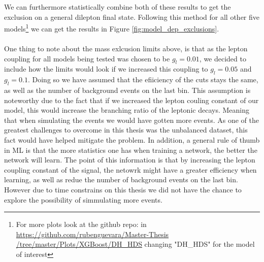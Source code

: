 \documentclass[12pt, a4paper]{book}
\begin{document}
\noindent We can furthermore statistically combine both of these results to get the exclusion on a general dilepton final state. Following this method for all other five models\footnote{For more plots look at the github repo: in \href{https://github.com/rubenguevara/Master-Thesis/tree/master/Plots/XGBoost/DH_HDS}{https://github.com/rubenguevara/Master-Thesis\\/tree/master/Plots/XGBoost/DH\_HDS} changing "DH\_HDS" for the model of interest} 
we can get the results in Figure \ref{fig:model_dep_exclusions}.\\
\\One thing to note about the mass exlcusion limits above, is that as the lepton coupling for all models being tested was chosen to be $g_l=0.01$, we decided to include how the limits would look if we increased this coupling 
to $g_l=0.05$ and $g_l=0.1$. Doing so we have assumed that the efiiciency of the cuts stays the same, as well as the number of background events on the last bin. This assumption is noteworthy due to the fact that if we increased the lepton couling constant of our model, this would increase the branching ratio 
of the leptonic decays. Meaning that when simulating the events we would have gotten more events. As one of the greatest challenges to overcome in this thesis was the unbalanced dataset, this fact would have helped mitigate the problem. 
In addition, a general rule of thumb in ML is that the more statistics one has when training a network, the better the network will learn. The point of this information is that by increasing the lepton coupling constant of the signal, the netowrk 
might have a greater efficiency when learning, as well as redue the number of background events on the last bin. However due to time constrains on this thesis we did not have the chance to explore the possibility of simmulating more events.
\clearpage
\end{document}
